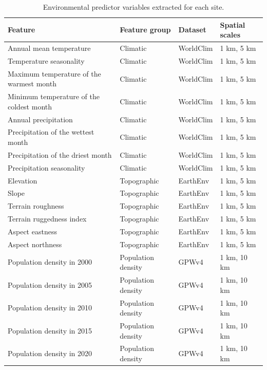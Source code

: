 \begin{table}[ht]
\centering
\small
\caption{Environmental predictor variables extracted for each site.}
\label{tab:environmental-features}
\begin{tabular}{p{} p{} p{} p{}}
\toprule
\textbf{Feature} & \textbf{Feature group} & \textbf{Dataset} & \textbf{Spatial scales} \\
\midrule
Annual mean temperature & Climatic & WorldClim & 1 km, 5 km \\
Temperature seasonality & Climatic & WorldClim & 1 km, 5 km \\
Maximum temperature of the warmest month & Climatic & WorldClim & 1 km, 5 km \\
Minimum temperature of the coldest month & Climatic & WorldClim & 1 km, 5 km \\
Annual precipitation & Climatic & WorldClim & 1 km, 5 km \\
Precipitation of the wettest month & Climatic & WorldClim & 1 km, 5 km \\
Precipitation of the driest month & Climatic & WorldClim & 1 km, 5 km \\
Precipitation seasonality & Climatic & WorldClim & 1 km, 5 km \\
\midrule
Elevation & Topographic & EarthEnv & 1 km, 5 km \\
Slope & Topographic & EarthEnv & 1 km, 5 km \\
Terrain roughness & Topographic & EarthEnv & 1 km, 5 km \\
Terrain ruggedness index & Topographic & EarthEnv & 1 km, 5 km \\
Aspect eastness & Topographic & EarthEnv & 1 km, 5 km \\
Aspect northness & Topographic & EarthEnv & 1 km, 5 km \\
\midrule
Population density in 2000 & Population density & GPWv4 & 1 km, 10 km \\
Population density in 2005 & Population density & GPWv4 & 1 km, 10 km \\
Population density in 2010 & Population density & GPWv4 & 1 km, 10 km \\
Population density in 2015 & Population density & GPWv4 & 1 km, 10 km \\
Population density in 2020 & Population density & GPWv4 & 1 km, 10 km \\
\bottomrule
\end{tabular}
\end{table}

